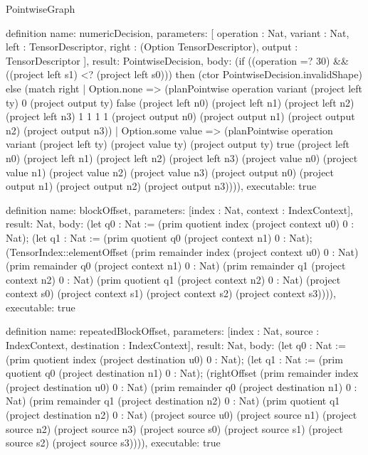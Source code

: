 \begin{lexlean}{PointwiseGraph}
\begin{semanticmodule}
definition{
  name: numericDecision,
  parameters: [
    operation : Nat,
    variant : Nat,
    left : TensorDescriptor,
    right : (Option TensorDescriptor),
    output : TensorDescriptor
  ],
  result: PointwiseDecision,
  body: (if ((operation =? 30) && ((project left s1) <? (project left s0))) then (ctor PointwiseDecision.invalidShape) else (match right
    | Option.none => (planPointwise operation variant (project left ty) 0 (project output ty) false (project left n0) (project left n1) (project left n2) (project left n3) 1 1 1 1 (project output n0) (project output n1) (project output n2) (project output n3))
    | Option.some value => (planPointwise operation variant (project left ty) (project value ty) (project output ty) true (project left n0) (project left n1) (project left n2) (project left n3) (project value n0) (project value n1) (project value n2) (project value n3) (project output n0) (project output n1) (project output n2) (project output n3)))),
  executable: true
}

definition{
  name: blockOffset,
  parameters: [index : Nat, context : IndexContext],
  result: Nat,
  body: (let q0 : Nat := (prim quotient index (project context u0) 0 : Nat); (let q1 : Nat := (prim quotient q0 (project context n1) 0 : Nat); (TensorIndex::elementOffset (prim remainder index (project context u0) 0 : Nat) (prim remainder q0 (project context n1) 0 : Nat) (prim remainder q1 (project context n2) 0 : Nat) (prim quotient q1 (project context n2) 0 : Nat) (project context s0) (project context s1) (project context s2) (project context s3)))),
  executable: true
}

definition{
  name: repeatedBlockOffset,
  parameters: [index : Nat, source : IndexContext, destination : IndexContext],
  result: Nat,
  body: (let q0 : Nat := (prim quotient index (project destination u0) 0 : Nat); (let q1 : Nat := (prim quotient q0 (project destination n1) 0 : Nat); (rightOffset (prim remainder index (project destination u0) 0 : Nat) (prim remainder q0 (project destination n1) 0 : Nat) (prim remainder q1 (project destination n2) 0 : Nat) (prim quotient q1 (project destination n2) 0 : Nat) (project source u0) (project source n1) (project source n2) (project source n3) (project source s0) (project source s1) (project source s2) (project source s3)))),
  executable: true
}


\end{semanticmodule}
\end{lexlean}
